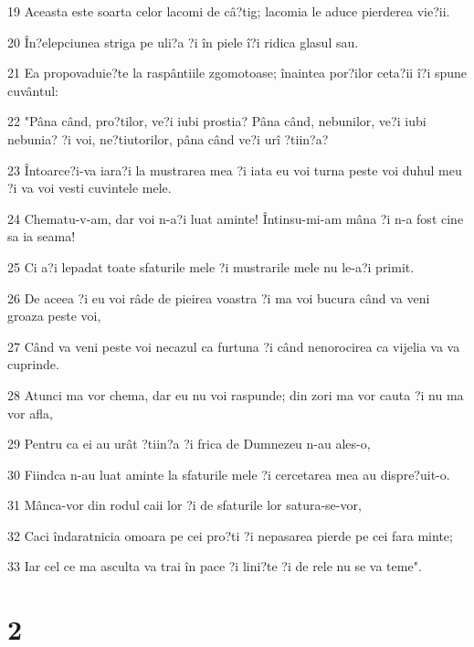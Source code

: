 \par 19 Aceasta este soarta celor lacomi de câ?tig; lacomia le aduce pierderea vie?ii.
\par 20 În?elepciunea striga pe uli?a ?i în piele î?i ridica glasul sau.
\par 21 Ea propovaduie?te la raspântiile zgomotoase; înaintea por?ilor ceta?ii î?i spune cuvântul:
\par 22 "Pâna când, pro?tilor, ve?i iubi prostia? Pâna când, nebunilor, ve?i iubi nebunia? ?i voi, ne?tiutorilor, pâna când ve?i urî ?tiin?a?
\par 23 Întoarce?i-va iara?i la mustrarea mea ?i iata eu voi turna peste voi duhul meu ?i va voi vesti cuvintele mele.
\par 24 Chematu-v-am, dar voi n-a?i luat aminte! Întinsu-mi-am mâna ?i n-a fost cine sa ia seama!
\par 25 Ci a?i lepadat toate sfaturile mele ?i mustrarile mele nu le-a?i primit.
\par 26 De aceea ?i eu voi râde de pieirea voastra ?i ma voi bucura când va veni groaza peste voi,
\par 27 Când va veni peste voi necazul ca furtuna ?i când nenorocirea ca vijelia va va cuprinde.
\par 28 Atunci ma vor chema, dar eu nu voi raspunde; din zori ma vor cauta ?i nu ma vor afla,
\par 29 Pentru ca ei au urât ?tiin?a ?i frica de Dumnezeu n-au ales-o,
\par 30 Fiindca n-au luat aminte la sfaturile mele ?i cercetarea mea au dispre?uit-o.
\par 31 Mânca-vor din rodul caii lor ?i de sfaturile lor satura-se-vor,
\par 32 Caci îndaratnicia omoara pe cei pro?ti ?i nepasarea pierde pe cei fara minte;
\par 33 Iar cel ce ma asculta va trai în pace ?i lini?te ?i de rele nu se va teme".

\chapter{2}

